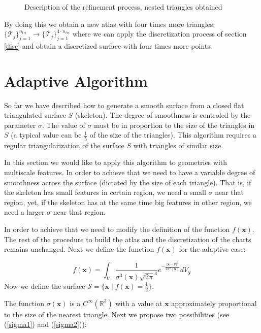 \documentclass[11pt, oneside]{article}
\newcommand\bx{\boldsymbol x}
\newcommand\by{\boldsymbol y}
\begin{document}
\begin{figure}[H]
\begin{center}
\end{center}
\caption{Description of the refinement process, nested triangles obtained}
\label{refinement3}
\end{figure}


By doing this we obtain a new atlas with four times more triangles: $\{\mathcal{T}_j\}_{j=1}^{n_{tri}}\rightarrow \{\mathcal{T}_j\}_{j=1}^{4\cdot n_{tri}}$ where we can apply the discretization process of section \ref{disc} and obtain a discretized surface with four times more points. 
 

\section{Adaptive Algorithm}

So far we have described how to generate a smooth surface from a closed flat triangulated surface $\mathit{S}$ (skeleton). The degree of smoothness is controled by the parameter $\sigma$. The value of $\sigma$ must be in proportion to the size of the triangles in $\mathit{S}$ (a typical value can be $\frac{1}{5}$ of the size of the triangles). This algorithm requires a regular triangularization of the surface $\mathit{S}$ with triangles of similar size.

In this section we would like to apply this algorithm to geometries with multiscale features. In order to achieve that we need to have a variable degree of smoothness across the surface (dictated by the size of each triangle). That is, if the skeleton has small features in certain region, we need a small $\sigma$ near that region, yet, if the skeleton has at the same time big features in other region, we need a larger $\sigma$ near that region.

In order to achieve that we need to modify the definition of the function $f(\bx)$. The rest of the procedure to build the atlas and the discretization of the charts remains unchanged. Next we define the function $f(\bx)$ for the adaptive case:

\begin{equation}
f(\bx)=\int_{V}\frac{1}{\sigma ^3(\bx)\sqrt{2\pi}^3}e^{-\frac{|\bx-\by|^2}{2\sigma^2(\bx)}}dV_{\by}
\end{equation}
Now we define the surface $\mathcal{S}=\{\bx \mid f(\bx)=\frac{1}{2}\}$.

The function $\sigma(\bx)$ is a $C^{\infty}(\mathbb{R}^3)$ with a value at $\bx$ approximately proportional to the size of the nearest triangle. Next we propose two possibilities (see (\ref{sigma1}) and (\ref{sigma2})):
\end{document}
